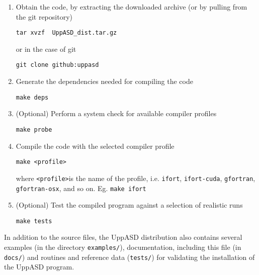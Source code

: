 \documentclass[11pt,fleqn,a4]{book} %
\begin{document}
\begin{gBox}
\begin{enumerate}
\item Obtain the code, by extracting the downloaded archive (or by pulling from the git repository)
\begin{verbatim}
tar xvzf  UppASD_dist.tar.gz
\end{verbatim}
or in the case of git
\begin{verbatim}
git clone github:uppasd
\end{verbatim}
\item Generate the dependencies needed for compiling the code
\begin{verbatim}
make deps
\end{verbatim}
\item (Optional) Perform a system check for available compiler profiles
\begin{verbatim}
make probe
\end{verbatim} 
\item Compile the code with the selected compiler profile
\begin{verbatim}
make <profile>
\end{verbatim}
where \texttt{<profile>}is the name of the profile, i.e. \texttt{ifort}, \texttt{ifort-cuda}, \texttt{gfortran}, \\
\texttt{gfortran-osx}, and so on. Eg. \texttt{make ifort} \\
\item (Optional) Test the compiled program against a selection of realistic runs
\begin{verbatim}
make tests
\end{verbatim}
\end{enumerate}
\end{gBox}

\noindent In addition to the source files, the UppASD distribution also contains several examples (in the directory \texttt{examples/}), documentation, including this file (in  \texttt{docs/}) and routines and reference data (\texttt{tests/}) for validating the installation of the UppASD program.
\end{document}
